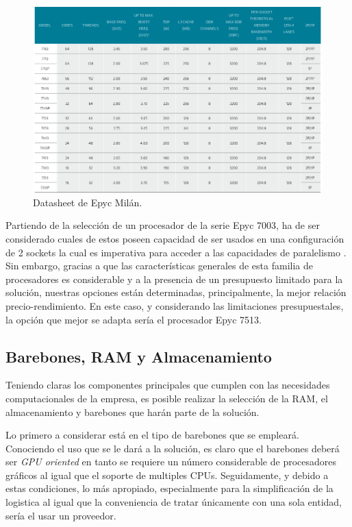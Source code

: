 \documentclass[conference,onecolumn]{IEEEtran}
\begin{document}
\begin{figure}
  \centering
  \includegraphics[scale=0.5]{AMD.png}
  \caption{Datasheet de Epyc Milán. \cite{AMDdatasheet}}
  \label{fig:amdData}
\end{figure}

Partiendo de la selección de un procesador de la serie Epyc 7003, ha de ser considerado cuales de estos poseen capacidad de ser usados en una configuración de 2 sockets la cual es imperativa para acceder a las capacidades de paralelismo \cite{techtarget_2019}. Sin embargo, gracias a que las características generales de esta familia de procesadores es considerable y a la presencia de un presupuesto limitado para la solución, nuestras opciones están determinadas, principalmente, la mejor relación precio-rendimiento. En este caso, y considerando las limitaciones presupuestales, la opción que mejor se adapta sería el procesador Epyc 7513. \medbreak  

\subsection{Barebones, RAM y Almacenamiento}
Teniendo claras los componentes principales que cumplen con las necesidades computacionales de la empresa, es posible realizar la selección de la RAM, el almacenamiento y barebones que harán parte de la solución. \medbreak

Lo primero a considerar está en el tipo de barebones que se empleará. Conociendo el uso que se le dará a la solución, es claro que el barebones deberá ser \textit{GPU oriented} en tanto se requiere un número considerable de procesadores gráficos al igual que el soporte de multiples CPUs. Seguidamente, y debido a estas condiciones, lo más apropiado, especialmente para la simplificación de la logistica al igual que la conveniencia de tratar únicamente con una sola entidad, sería el usar un proveedor. \medbreak
\end{document}
